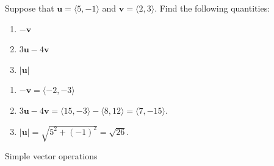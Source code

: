 \documentclass[handout]{ximera}
\begin{document}
\begin{problem}
Suppose that $\mathbf{u}=\langle5, -1\rangle$ and $\mathbf{v}=\langle 2, 3\rangle$. Find the following quantities:
\begin{enumerate}
\item $-\mathbf{v}$
\item $3\mathbf{u}-4\mathbf{v}$
\item $|\mathbf{u}|$
\end{enumerate}
	\begin{freeResponse}
	\begin{enumerate}
	\item $-\mathbf{v}= \langle -2, -3 \rangle$
	\item $3\mathbf{u}-4\mathbf{v} = \langle 15, -3 \rangle - \langle 8, 12 \rangle = \langle 7, -15 \rangle$.
	\item $|\mathbf{u}|= \sqrt{5^2+(-1)^2} = \sqrt{26}.$
	\end{enumerate}
	\end{freeResponse}
		
\end{problem}

\begin{instructorNotes}
Simple vector operations
\end{instructorNotes}
\end{document}
